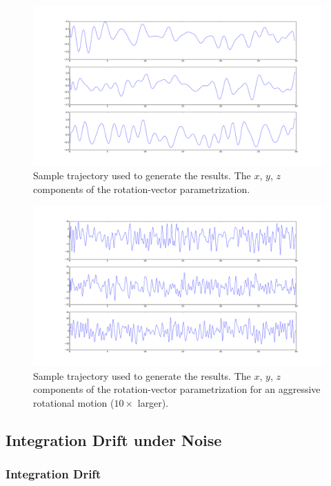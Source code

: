 \documentclass[10pt,a4paper]{article}
\numberwithin{equation}{section}
\begin{document}
\begin{figure}
\includegraphics[width=14cm]{figures/sample_rotation_vector_curve.pdf}
\caption{Sample trajectory used to generate the results. The $x$, $y$, $z$ components of the rotation-vector parametrization.}
\label{fig:sample_rotation_curve}
\end{figure}	

\begin{figure}
\includegraphics[width=14cm]{figures/sample_rotation_vector_curve_aggressive.pdf}
\caption{Sample trajectory used to generate the results. The $x$, $y$, $z$ components of the rotation-vector parametrization for an aggressive rotational motion ($10 \times$ larger).}
\label{fig:sample_rotation_curve_aggressive}
\end{figure}	

\subsection{Integration Drift under Noise}

\subsubsection{Integration Drift}
\end{document}
